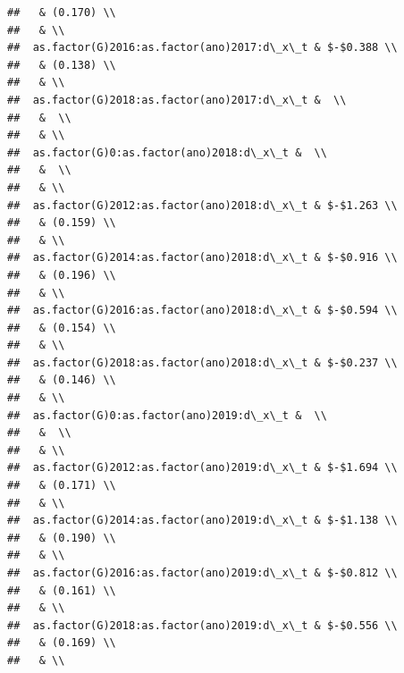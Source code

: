 \documentclass[
]{article}
\begin{document}
\begin{verbatim}
##   & (0.170) \\ 
##   & \\ 
##  as.factor(G)2016:as.factor(ano)2017:d\_x\_t & $-$0.388 \\ 
##   & (0.138) \\ 
##   & \\ 
##  as.factor(G)2018:as.factor(ano)2017:d\_x\_t &  \\ 
##   &  \\ 
##   & \\ 
##  as.factor(G)0:as.factor(ano)2018:d\_x\_t &  \\ 
##   &  \\ 
##   & \\ 
##  as.factor(G)2012:as.factor(ano)2018:d\_x\_t & $-$1.263 \\ 
##   & (0.159) \\ 
##   & \\ 
##  as.factor(G)2014:as.factor(ano)2018:d\_x\_t & $-$0.916 \\ 
##   & (0.196) \\ 
##   & \\ 
##  as.factor(G)2016:as.factor(ano)2018:d\_x\_t & $-$0.594 \\ 
##   & (0.154) \\ 
##   & \\ 
##  as.factor(G)2018:as.factor(ano)2018:d\_x\_t & $-$0.237 \\ 
##   & (0.146) \\ 
##   & \\ 
##  as.factor(G)0:as.factor(ano)2019:d\_x\_t &  \\ 
##   &  \\ 
##   & \\ 
##  as.factor(G)2012:as.factor(ano)2019:d\_x\_t & $-$1.694 \\ 
##   & (0.171) \\ 
##   & \\ 
##  as.factor(G)2014:as.factor(ano)2019:d\_x\_t & $-$1.138 \\ 
##   & (0.190) \\ 
##   & \\ 
##  as.factor(G)2016:as.factor(ano)2019:d\_x\_t & $-$0.812 \\ 
##   & (0.161) \\ 
##   & \\ 
##  as.factor(G)2018:as.factor(ano)2019:d\_x\_t & $-$0.556 \\ 
##   & (0.169) \\ 
##   & \\ 

\end{verbatim}
\end{document}
